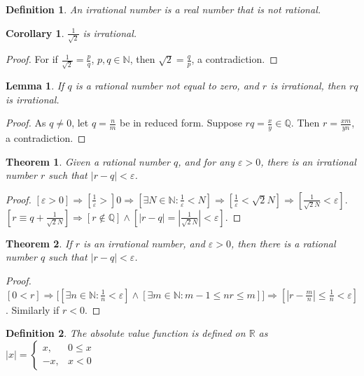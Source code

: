 \documentclass[12pt,oneside]{book}
\theoremstyle{mystyle}
\newtheorem{theorem}{Theorem}[section]
\newtheorem{definition}{Definition}[section]
\newtheorem{lemma}{Lemma}[section]
\newtheorem{corollary}{Corollary}[section]
\begin{document}
\begin{definition}
An irrational number is a real number that is not rational.
\end{definition}

\begin{corollary}
$\frac{1}{\sqrt{2}}$ is irrational. 
\end{corollary}
\begin{proof}
For if $\frac{1}{\sqrt{2}} = \frac{p}{q}$, $p,q\in \mathbb{N}$, then $\sqrt{2} = \frac{q}{p}$, a contradiction.
\end{proof}

\begin{lemma}
If $q$ is a rational number not equal to zero, and $r$ is irrational, then $rq$ is irrational.
\end{lemma}
\begin{proof}
As $q\ne 0$, let $q = \frac{n}{m}$ be in reduced form. Suppose $rq = \frac{x}{y}\in \mathbb{Q}$. Then $r=\frac{xm}{yn}$, a contradiction.
\end{proof}

\begin{theorem}
Given a rational number $q$, and for any $\varepsilon>0$, there is an irrational number $r$ such that $|r-q|<\varepsilon$.
\end{theorem}
\begin{proof}
$[\varepsilon>0]\Rightarrow [\frac{1}{\varepsilon}>]0\Rightarrow [\exists N\in \mathbb{N}:\frac{1}{\varepsilon}<N]\Rightarrow [\frac{1}{\varepsilon} < \sqrt{2}N]\Rightarrow [\frac{1}{\sqrt{2}N}< \varepsilon]$. $[r \equiv q+\frac{1}{\sqrt{2}{N}}]\Rightarrow [r\notin \mathbb{Q}]\land [|r-q| = |\frac{1}{\sqrt{2}N}| < \varepsilon]$.
\end{proof}

\begin{theorem}
If $r$ is an irrational number, and $\varepsilon>0$, then there is a rational number $q$ such that $|r-q|<\varepsilon$.
\end{theorem}
\begin{proof}
$[0<r]\Rightarrow \big[[\exists n\in \mathbb{N}: \frac{1}{n} < \varepsilon]\land[\exists m\in \mathbb{N}: m-1\leq nr \leq m]\big]\Rightarrow[|r-\frac{m}{n}| \leq \frac{1}{n} < \varepsilon]$. Similarly if $r<0$.
\end{proof}

\begin{definition}
The absolute value function is defined on $\mathbb{R}$ as $|x| = \begin{cases} x, & 0 \leq x \\ -x, & x<0 \end{cases}$
\end{definition}
\end{document}

